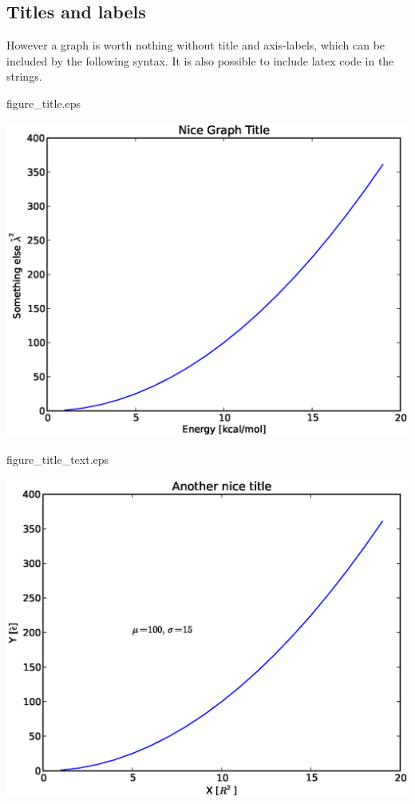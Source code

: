 \documentclass{article}
\begin{document}
\newpage
\subsection{Titles and labels}

However a graph is worth nothing without title and axis-labels,
which can be included by the following syntax.
It is also possible to include latex code in the strings.

\begin{multicols}{2}

    

\columnbreak

    \centering

    figure\_title.eps

    \includegraphics[width=1.0\linewidth]{py/figure_title.eps}

    figure\_title\_text.eps

    \includegraphics[width=1.0\linewidth]{py/figure_title_text.eps}

\end{multicols}
\end{document}
